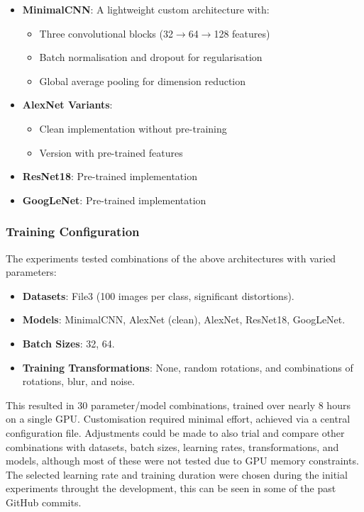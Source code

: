 \documentclass[conference]{IEEEtran}
\begin{document}
\begin{itemize}
    \item \textbf{MinimalCNN}: A lightweight custom architecture with:
    \begin{itemize}
        \item Three convolutional blocks (32$\rightarrow$64$\rightarrow$128 features)
        \item Batch normalisation and dropout for regularisation
        \item Global average pooling for dimension reduction
    \end{itemize}
    
    \item \textbf{AlexNet Variants}:
    \begin{itemize}
        \item Clean implementation without pre-training
        \item Version with pre-trained features
    \end{itemize}
    
    \item \textbf{ResNet18}: Pre-trained implementation
    \item \textbf{GoogLeNet}: Pre-trained implementation
\end{itemize}

\subsubsection{Training Configuration}

The experiments tested combinations of the above architectures with varied parameters:

\begin{itemize}
  \item \textbf{Datasets}: File3 (100 images per class, significant distortions).
  \item \textbf{Models}: MinimalCNN, AlexNet (clean), AlexNet, ResNet18, GoogLeNet.
  \item \textbf{Batch Sizes}: 32, 64.
  \item \textbf{Training Transformations}: None, random rotations, and combinations of rotations, blur, and noise.
\end{itemize}

This resulted in 30 parameter/model combinations, trained over nearly 8 hours on a single GPU. Customisation required
minimal effort, achieved via a central configuration file. Adjustments could be made to also trial and compare other combinations with
datasets, batch sizes, learning rates, transformations, and models, although most of these were not tested due to GPU memory constraints.
The selected learning rate and training duration were chosen during the initial experiments throught the development, this can be seen 
in some of the past GitHub commits.
\end{document}
